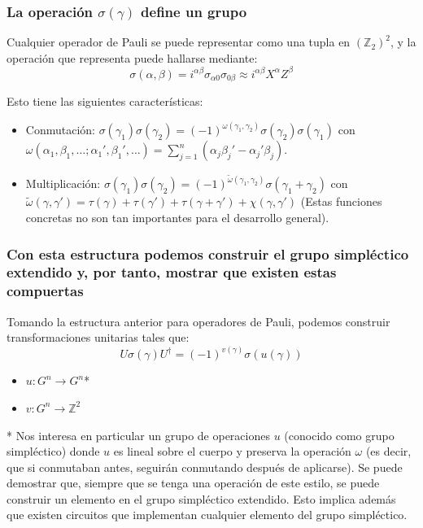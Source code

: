 \documentclass[english,9pt]{Linnaeus}
\begin{document}
\begin{frame}[allowframebreaks]
  \frametitle{La operación $\sigma(\gamma)$ define un grupo}
  Cualquier operador de Pauli se puede representar como una tupla en $(\mathbb{Z}_2)^2$, y la operación que representa puede hallarse mediante:
  \begin{equation}
    \sigma(\alpha, \beta) = i^{\alpha\beta} \sigma_{\alpha 0}\sigma_{0 \beta} \approx i^{\alpha\beta} X^\alpha Z^\beta
    \label{eq:sigma}
  \end{equation}

  Esto tiene las siguientes características:
  \begin{itemize}
    \item Conmutación: $\sigma(\gamma_1)\sigma(\gamma_2) = (-1)^{\omega(\gamma_1, \gamma_2)} \sigma(\gamma_2)\sigma(\gamma_1)$ con $\omega(\alpha_1, \beta_1, \ldots; \alpha_1', \beta_1', \ldots) = \sum_{j = 1}^n (\alpha_j \beta_j' - \alpha_j'\beta_j)$.
    \item Multiplicación: $\sigma(\gamma_1)\sigma(\gamma_2) = (-1)^{\tilde{\omega}(\gamma_1, \gamma_2)} \sigma(\gamma_1 + \gamma_2)$ con $\tilde{\omega}(\gamma, \gamma') = \tau(\gamma) + \tau(\gamma') + \tau(\gamma + \gamma') + \chi(\gamma, \gamma')$ (Estas funciones concretas no son tan importantes para el desarrollo general).
  \end{itemize}
\end{frame}

\begin{frame}
  \frametitle{Con esta estructura podemos construir el grupo simpléctico extendido y, por tanto, mostrar que existen estas compuertas}

  Tomando la estructura anterior para operadores de Pauli, podemos construir transformaciones unitarias tales que:
  \begin{equation}
    U \sigma(\gamma) U^\dagger = (-1)^{v(\gamma)}\sigma(u(\gamma))
    \label{eq:ESp2}
  \end{equation}
  \begin{itemize}
    \item $u : G^n \to G^n$*
    \item $v : G^n \to \mathbb{Z}^2$
  \end{itemize}

  \vspace{0.5cm}
  \tiny{* Nos interesa en particular un grupo de operaciones $u$ (conocido como grupo simpléctico) donde $u$ es lineal sobre el cuerpo y preserva la operación $\omega$ (es decir, que si conmutaban antes, seguirán conmutando después de aplicarse). Se puede demostrar que, siempre que se tenga una operación de este estilo, se puede construir un elemento en el grupo simpléctico extendido. Esto implica además que existen circuitos que implementan cualquier elemento del grupo simpléctico.}
\end{frame}
\end{document}
